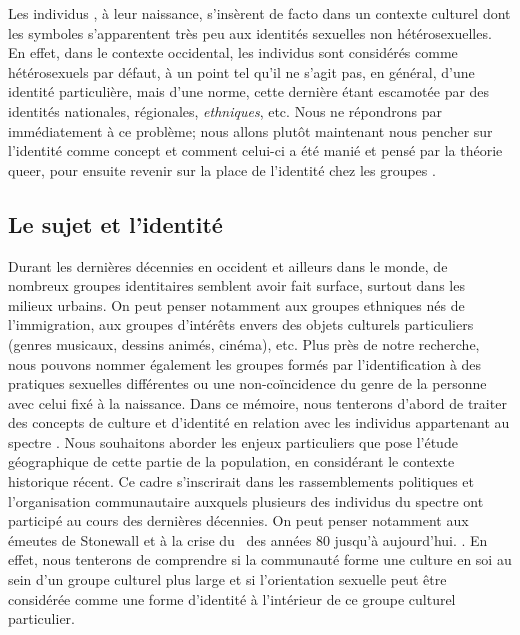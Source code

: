 Les individus \lgbt{}, à leur naissance, s'insèrent de facto dans un contexte culturel dont les symboles s'apparentent très peu aux identités sexuelles non hétérosexuelles. 
En effet, dans le contexte occidental, les individus sont considérés comme hétérosexuels par défaut, à un point tel qu'il ne s'agit pas, en général, d'une identité particulière, mais d'une norme, cette dernière étant escamotée par des identités nationales, régionales, \emph{ethniques}, etc.
Nous ne répondrons par immédiatement à ce problème; nous allons plutôt maintenant nous pencher sur l'identité comme concept et comment celui-ci a été manié et pensé par la théorie queer, pour ensuite revenir sur la place de l'identité chez les groupes \lgbt{}.

\subsection{Le sujet et l'identité}
\label{subsec:sujet_et_identité} Durant les dernières décennies en occident et ailleurs dans le monde, de nombreux groupes identitaires semblent avoir fait surface, surtout dans les milieux urbains. 
On peut penser notamment aux groupes ethniques nés de l'immigration, aux groupes d'intérêts envers des objets culturels particuliers (genres musicaux, dessins animés, cinéma), etc. 
Plus près de notre recherche, nous pouvons nommer également les groupes formés par l'identification à des pratiques sexuelles différentes ou une non-coïncidence du genre de la personne avec celui fixé à la naissance. 
Dans ce mémoire, nous tenterons d'abord de traiter des concepts de culture et d'identité en relation avec les individus appartenant au spectre \lgbt{} . 
Nous souhaitons aborder les enjeux particuliers que pose l'étude géographique de cette partie de la population, en considérant le contexte historique récent. 
Ce cadre s'inscrirait dans les rassemblements politiques et l'organisation communautaire auxquels plusieurs des individus du spectre \lgbt{} ont participé au cours des dernières décennies.
On peut penser notamment aux émeutes de Stonewall et à la crise du \sida\ des années 80 jusqu'à aujourd'hui.
. 
En effet, nous tenterons de comprendre si la communauté \lgbt{} forme une culture en soi au sein d'un groupe culturel plus large et si l'orientation sexuelle peut être considérée comme une forme d'identité à l'intérieur de ce groupe culturel particulier. 

